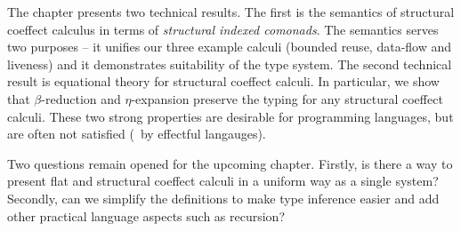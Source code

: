 The chapter presents two technical results. The first is the semantics of structural coeffect
calculus in terms of \emph{structural indexed comonads}. The semantics serves two purposes --
it unifies our three example calculi (bounded reuse, data-flow and liveness) and it demonstrates
suitability of the type system. The second technical result is equational theory for structural
coeffect calculi. In particular, we show that $\beta$-reduction and $\eta$-expansion preserve
the typing for any structural coeffect calculi. These two strong properties are desirable for
programming languages, but are often not satisfied (\eg~by effectful langauges).

Two questions remain opened for the upcoming chapter. Firstly, is there a way to present 
flat and structural coeffect calculi in a uniform way as a single system? Secondly, can we
simplify the definitions to make type inference easier and add other practical language
aspects such as recursion?